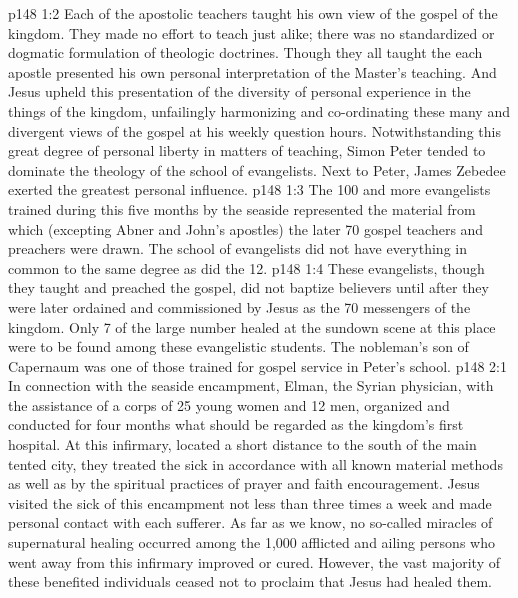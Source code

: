 \vs p148 1:2 Each of the apostolic teachers taught his own view of the gospel of the kingdom. They made no effort to teach just alike; there was no standardized or dogmatic formulation of theologic doctrines. Though they all taught the  each apostle presented his own personal interpretation of the Master’s teaching. And Jesus upheld this presentation of the diversity of personal experience in the things of the kingdom, unfailingly harmonizing and co\hyp{}ordinating these many and divergent views of the gospel at his weekly question hours. Notwithstanding this great degree of personal liberty in matters of teaching, Simon Peter tended to dominate the theology of the school of evangelists. Next to Peter, James Zebedee exerted the greatest personal influence.
\vs p148 1:3 The 100 and more evangelists trained during this five months by the seaside represented the material from which (excepting Abner and John’s apostles) the later 70 gospel teachers and preachers were drawn. The school of evangelists did not have everything in common to the same degree as did the 12.
\vs p148 1:4 These evangelists, though they taught and preached the gospel, did not baptize believers until after they were later ordained and commissioned by Jesus as the 70 messengers of the kingdom. Only 7 of the large number healed at the sundown scene at this place were to be found among these evangelistic students. The nobleman’s son of Capernaum was one of those trained for gospel service in Peter’s school.
\vs p148 2:1 In connection with the seaside encampment, Elman, the Syrian physician, with the assistance of a corps of 25 young women and 12 men, organized and conducted for four months what should be regarded as the kingdom’s first hospital. At this infirmary, located a short distance to the south of the main tented city, they treated the sick in accordance with all known material methods as well as by the spiritual practices of prayer and faith encouragement. Jesus visited the sick of this encampment not less than three times a week and made personal contact with each sufferer. As far as we know, no so\hyp{}called miracles of supernatural healing occurred among the 1,000 afflicted and ailing persons who went away from this infirmary improved or cured. However, the vast majority of these benefited individuals ceased not to proclaim that Jesus had healed them.
